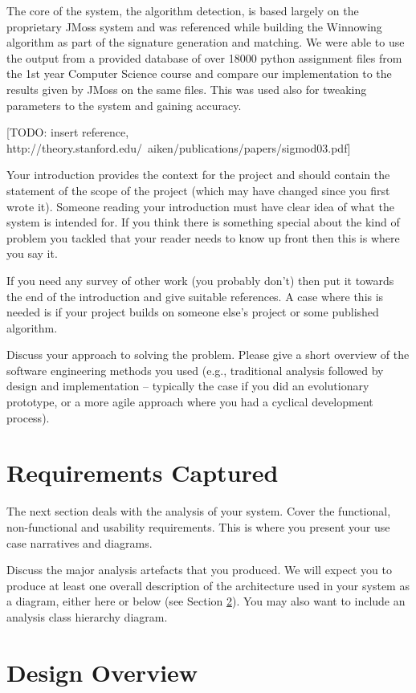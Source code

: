 \documentclass[11pt,a4paper]{article}
\begin{document}
The core of the system, the algorithm detection, is based largely on the proprietary
JMoss system and was referenced while building the Winnowing algorithm as part of the
signature generation and matching. We were able to use the output from a provided database of
over 18000 python assignment files from the 1st year Computer Science course and compare
our implementation to the results given by JMoss on the same files. This was used also for
tweaking parameters to the system and gaining accuracy.

[TODO: insert reference, http://theory.stanford.edu/~aiken/publications/papers/sigmod03.pdf]

Your introduction provides the context for the project and should
contain the statement of the scope of the project (which may have
changed since you first wrote it). Someone reading your introduction
must have clear idea of what the system is intended for. If you think
there is something special about the kind of problem you tackled that
your reader needs to know up front then this is where you say it.

If you need any survey of other work (you probably don't) then put it
towards the end of the introduction and give suitable references. A
case where this is needed is if your project builds on someone else's
project or some published algorithm.

Discuss your approach to solving the problem. Please give a short
overview of the software engineering methods you used (e.g.,
traditional analysis followed by design and implementation -- typically
the case if you did an evolutionary prototype, or a more agile
approach where you had a cyclical development process). 

\section{Requirements Captured}

The next section deals with the analysis of your system. Cover the
functional, non-functional and usability requirements. This is where
you present your use case narratives and diagrams. 

Discuss the major analysis artefacts that you produced. We will expect
you to produce at least one overall description of the architecture
used in your system as a diagram, either here or below (see Section
\ref{s:design-overview}). You may also want to include an analysis
class hierarchy diagram.

\section{Design Overview}
\label{s:design-overview}
\end{document}

